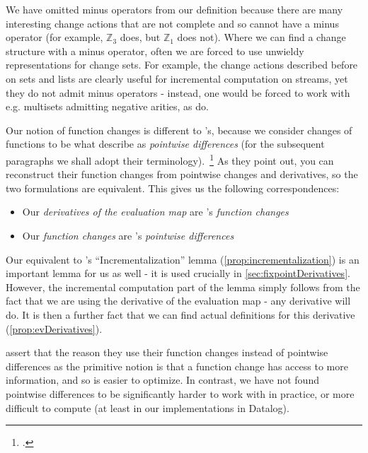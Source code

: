 We have omitted minus operators from our definition because
there are many interesting change actions that are not complete and so cannot 
have a minus operator (for example, $\mathbb{Z}_3$ does, but $\mathbb{Z}_1$ does
not). Where we can find a change structure with a minus operator, often we are
forced to use unwieldy representations for change sets. For example, the change actions described before on sets and lists are clearly
useful for incremental computation on streams, yet they do not admit minus operators - instead, one would
be forced to work with e.g. multisets admitting negative arities, as \textcite{cai2014changes} do.

Our notion of function changes is different to \citeauthor{cai2014changes}'s,
because we consider changes of functions to be what \citeauthor{cai2014changes} describe as
\textit{pointwise differences} (for the subsequent paragraphs we shall adopt
their terminology).~\footcite[See][section 2.2]{cai2014changes} As they point out, you can reconstruct their
function changes from pointwise changes and derivatives, so the two formulations
are equivalent. This gives us the following correspondences:
\begin{itemize}
  \item Our \textit{derivatives of the
      evaluation map} are \citeauthor{cai2014changes}'s \textit{function changes}
  \item Our \textit{function changes} are \citeauthor{cai2014changes}'s \textit{pointwise differences}
\end{itemize}

Our equivalent to \citeauthor{cai2014changes}'s ``Incrementalization'' lemma
(\cref{prop:incrementalization}) is an important lemma for us as well - it is used
crucially in \cref{sec:fixpointDerivatives}. However, the incremental computation part of
the lemma simply follows from the fact that we are using the derivative of the
evaluation map - any derivative will do. It is then a further fact that we can
find actual definitions for this derivative (\cref{prop:evDerivatives}).

\citeauthor{cai2014changes} assert that the reason they use their function changes instead of pointwise
differences as the primitive notion is that a function change has access to more
information, and so is easier to optimize. In contrast, we have not found pointwise differences to be
significantly harder to work with in practice, or more difficult to compute (at least in our implementations
in Datalog).

